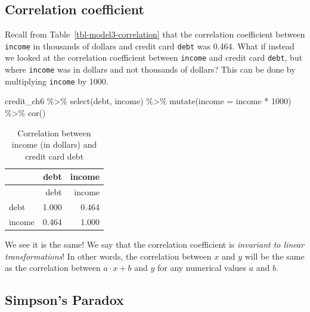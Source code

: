 \documentclass[
  letterpaper,
  DIV=11,
  numbers=noendperiod]{scrreprt}
\newenvironment{Shaded}{\begin{snugshade}}{\end{snugshade}}
\newcommand{\AttributeTok}[1]{\textcolor[rgb]{0.40,0.45,0.13}{#1}}
\newcommand{\DecValTok}[1]{\textcolor[rgb]{0.68,0.00,0.00}{#1}}
\newcommand{\FunctionTok}[1]{\textcolor[rgb]{0.28,0.35,0.67}{#1}}
\newcommand{\NormalTok}[1]{\textcolor[rgb]{0.00,0.23,0.31}{#1}}
\newcommand{\SpecialCharTok}[1]{\textcolor[rgb]{0.37,0.37,0.37}{#1}}
\theoremstyle{definition}
\theoremstyle{remark}
\begin{document}
\hypertarget{sec-correlationcoefficient2}{%
\subsection{Correlation coefficient}\label{sec-correlationcoefficient2}}

Recall from Table~\ref{tbl-model3-correlation} that the correlation
coefficient between \texttt{income} in
thousands of dollars and credit card \texttt{debt} was 0.464. What if
instead we looked at the correlation coefficient between \texttt{income}
and credit card \texttt{debt}, but where \texttt{income} was in dollars
and not thousands of dollars? This can be done by multiplying
\texttt{income} by 1000.

\begin{Shaded}
\begin{Highlighting}[]
\NormalTok{credit\_ch6 }\SpecialCharTok{\%\textgreater{}\%} 
  \FunctionTok{select}\NormalTok{(debt, income) }\SpecialCharTok{\%\textgreater{}\%} 
  \FunctionTok{mutate}\NormalTok{(}\AttributeTok{income =}\NormalTok{ income }\SpecialCharTok{*} \DecValTok{1000}\NormalTok{) }\SpecialCharTok{\%\textgreater{}\%} 
  \FunctionTok{cor}\NormalTok{()}
\end{Highlighting}
\end{Shaded}

\hypertarget{tbl-cor-credit-2}{}
\begin{longtable}[]{@{}lrr@{}}
\caption{\label{tbl-cor-credit-2}Correlation between income (in dollars)
and credit card debt}\tabularnewline
\toprule()
& debt & income \\
\midrule()
\endfirsthead
\toprule()
& debt & income \\
\midrule()
\endhead
debt & 1.000 & 0.464 \\
income & 0.464 & 1.000 \\
\bottomrule()
\end{longtable}

We see it is the same! We say that the correlation coefficient is
\emph{invariant to linear transformations}! In other words, the
correlation between \(x\) and \(y\) will be the same as the correlation
between \(a\cdot x + b\) and \(y\) for any numerical values \(a\) and
\(b\).

\hypertarget{sec-simpsonsparadox}{%
\subsection{Simpson's Paradox}\label{sec-simpsonsparadox}}
\end{document}
